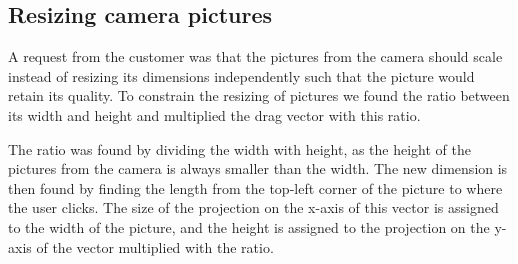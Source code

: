 \subsection{Resizing camera pictures}
A request from the customer was that the pictures from the camera should scale instead of resizing its dimensions independently such that the picture would retain its quality.
To constrain the resizing of pictures we found the ratio between its width and height and multiplied the drag vector with this ratio.

The ratio was found by dividing the width with height, as the height of the pictures from the camera is always smaller than the width.
The new dimension is then found by finding the length from the top-left corner of the picture to where the user clicks.
The size of the projection on the x-axis of this vector is assigned to the width of the picture, and the height is assigned to the projection on the y-axis of the vector multiplied with the ratio.